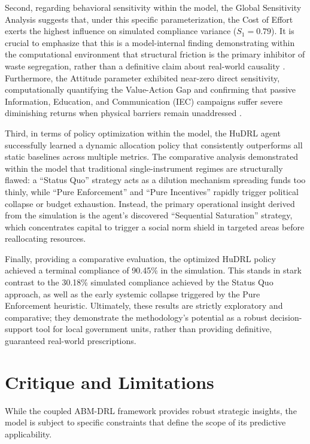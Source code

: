 Second, regarding behavioral sensitivity within the model, the Global Sensitivity Analysis suggests that, under this specific parameterization, the Cost of Effort exerts the highest influence on simulated compliance variance ($S_1 = 0.79$). It is crucial to emphasize that this is a model-internal finding demonstrating within the computational environment that structural friction is the primary inhibitor of waste segregation, rather than a definitive claim about real-world causality \citep{Yazawa2025}. Furthermore, the Attitude parameter exhibited near-zero direct sensitivity, computationally quantifying the Value-Action Gap and confirming that passive Information, Education, and Communication (IEC) campaigns suffer severe diminishing returns when physical barriers remain unaddressed \citep{Zhao2022}.

Third, in terms of policy optimization within the model, the HuDRL agent successfully learned a dynamic allocation policy that consistently outperforms all static baselines across multiple metrics. The comparative analysis demonstrated within the model that traditional single-instrument regimes are structurally flawed: a ``Status Quo'' strategy acts as a dilution mechanism spreading funds too thinly, while ``Pure Enforcement'' and ``Pure Incentives'' rapidly trigger political collapse or budget exhaustion. Instead, the primary operational insight derived from the simulation is the agent's discovered ``Sequential Saturation'' strategy, which concentrates capital to trigger a social norm shield in targeted areas before reallocating resources.

Finally, providing a comparative evaluation, the optimized HuDRL policy achieved a terminal compliance of 90.45\% in the simulation. This stands in stark contrast to the 30.18\% simulated compliance achieved by the Status Quo approach, as well as the early systemic collapse triggered by the Pure Enforcement heuristic. Ultimately, these results are strictly exploratory and comparative; they demonstrate the methodology's potential as a robust decision-support tool for local government units, rather than providing definitive, guaranteed real-world prescriptions.

\section{Critique and Limitations}
\setlength{\parindent}{2em}

While the coupled ABM-DRL framework provides robust strategic insights, the model is subject to specific constraints that define the scope of its predictive applicability.

